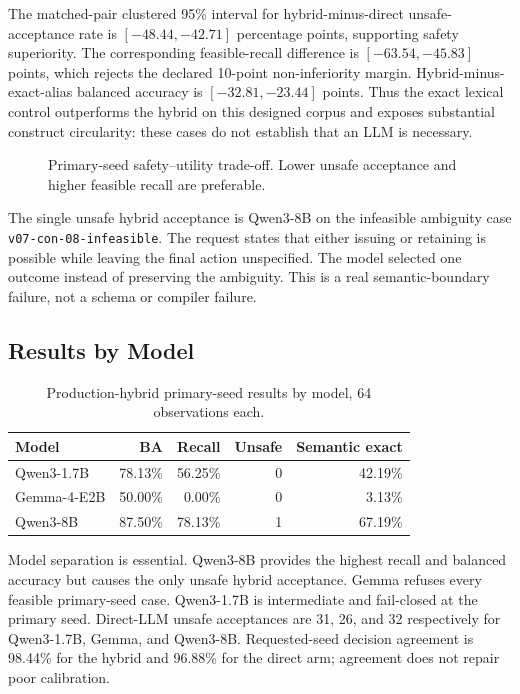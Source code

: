 The matched-pair clustered 95\% interval for hybrid-minus-direct unsafe-acceptance rate is $[-48.44,-42.71]$ percentage points, supporting safety superiority. The corresponding feasible-recall difference is $[-63.54,-45.83]$ points, which rejects the declared 10-point non-inferiority margin. Hybrid-minus-exact-alias balanced accuracy is $[-32.81,-23.44]$ points. Thus the exact lexical control outperforms the hybrid on this designed corpus and exposes substantial construct circularity: these cases do not establish that an LLM is necessary.

\begin{figure}[htbp]
\centering

\caption{Primary-seed safety--utility trade-off. Lower unsafe acceptance and higher feasible recall are preferable.}
\label{fig:v07-safety-utility}
\end{figure}

The single unsafe hybrid acceptance is Qwen3-8B on the infeasible ambiguity case \texttt{v07-con-08-infeasible}. The request states that either issuing or retaining is possible while leaving the final action unspecified. The model selected one outcome instead of preserving the ambiguity. This is a real semantic-boundary failure, not a schema or compiler failure.

\subsection{Results by Model}

\begin{table}[htbp]
\centering
\caption{Production-hybrid primary-seed results by model, 64 observations each.}
\label{tab:v07-models}
\begin{tabular}{lrrrr}
\toprule
\textbf{Model} & \textbf{BA} & \textbf{Recall} & \textbf{Unsafe} & \textbf{Semantic exact} \\
\midrule
Qwen3-1.7B & 78.13\% & 56.25\% & 0 & 42.19\% \\
Gemma-4-E2B & 50.00\% & 0.00\% & 0 & 3.13\% \\
Qwen3-8B & 87.50\% & 78.13\% & 1 & 67.19\% \\
\bottomrule
\end{tabular}
\end{table}

Model separation is essential. Qwen3-8B provides the highest recall and balanced accuracy but causes the only unsafe hybrid acceptance. Gemma refuses every feasible primary-seed case. Qwen3-1.7B is intermediate and fail-closed at the primary seed. Direct-LLM unsafe acceptances are 31, 26, and 32 respectively for Qwen3-1.7B, Gemma, and Qwen3-8B. Requested-seed decision agreement is 98.44\% for the hybrid and 96.88\% for the direct arm; agreement does not repair poor calibration.

